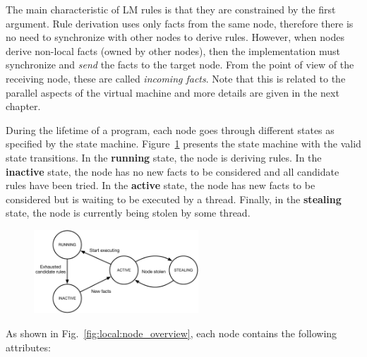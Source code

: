 The main characteristic of LM rules is that they are constrained by the first
argument. Rule derivation uses only facts from the same node, therefore there
is no need to synchronize with other nodes to derive rules. However, when nodes
derive non-local facts (owned by other nodes), then the implementation must
synchronize and \emph{send} the facts to the target node. From the point of view
of the receiving node, these are called \emph{incoming facts}. Note that this is
related to the parallel aspects of the virtual machine and more details are
given in the next chapter.

During the lifetime of a program, each node goes through different states as
specified by the state machine. Figure~\ref{fig:local:node_states} presents the
state machine with the valid state transitions.  In the \textbf{running} state,
the node is deriving rules. In the \textbf{inactive} state, the node has no new
facts to be considered and all candidate rules have been tried. In the
\textbf{active} state, the node has new facts to be considered but is waiting to
be executed by a thread. Finally, in the \textbf{stealing} state, the node is
currently being stolen by some thread.

\begin{figure}[ht]
   \centering
   \includegraphics[width=0.55\textwidth]{figures/local/node_state.pdf}
   \label{fig:local:node_states}
\end{figure}

As shown in Fig.~\ref{fig:local:node_overview}, each node contains the
following attributes:

